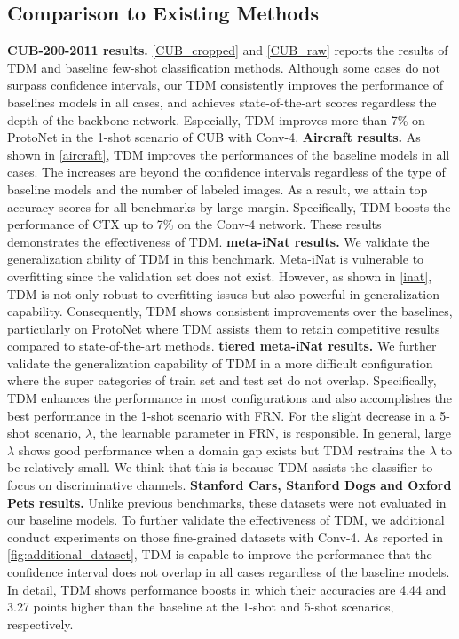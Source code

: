 \subsection{Comparison to Existing Methods}
\noindent\textbf{CUB-200-2011 results.} \cref{CUB_cropped} and \cref{CUB_raw} reports the results of TDM and baseline few-shot classification methods. 
Although some cases do not surpass confidence intervals, our TDM consistently improves the performance of baselines models in all cases, and achieves state-of-the-art scores regardless the depth of the backbone network.
Especially, TDM improves more than 7\% on ProtoNet in the 1-shot scenario of CUB with Conv-4. 
\newline
\textbf {Aircraft results.} 
As shown in \cref{aircraft}, TDM improves the performances of the baseline models in all cases. 
The increases are beyond the confidence intervals regardless of the type of baseline models and the number of labeled images. 
As a result, we attain top accuracy scores for all benchmarks by large margin. Specifically, TDM boosts the performance of CTX\cite{doersch2020crosstransformers} up to 7\% on the Conv-4 network.
These results demonstrates the effectiveness of TDM.
\newline
\textbf{meta-iNat results.} 
We validate the generalization ability of TDM in this benchmark. 
Meta-iNat is vulnerable to overfitting since the validation set does not exist.
However, as shown in \cref{inat}, TDM is not only robust to overfitting issues but also powerful in generalization capability.
Consequently, TDM shows consistent improvements over the baselines, particularly on ProtoNet where TDM assists them to retain competitive results compared to state-of-the-art methods.
\newline
\textbf{tiered meta-iNat results.} 
We further validate the generalization capability of TDM in a more difficult configuration where the super categories of train set and test set do not overlap. 
Specifically, TDM enhances the performance in most configurations and also accomplishes the best performance in the 1-shot scenario with FRN. 
For the slight decrease in a 5-shot scenario, $\lambda$, the learnable parameter in FRN, is responsible. 
In general, large $\lambda$ shows good performance when a domain gap exists but TDM restrains the $\lambda$ to be relatively small.
We think that this is because TDM assists the classifier to focus on discriminative channels\cite{wertheimer2021few}.
\newline
\textbf{Stanford Cars, Stanford Dogs and Oxford Pets results.} 
Unlike previous benchmarks, these datasets were not evaluated in our baseline models\cite{snell2017prototypical, simon2020adaptive, doersch2020crosstransformers ,wertheimer2021few}. 
To further validate the effectiveness of TDM, we additional conduct experiments on those fine-grained datasets with Conv-4.
As reported in \cref{fig:additional_dataset}, TDM is capable to improve the performance that the confidence interval does not overlap in all cases regardless of the baseline models.
In detail, TDM shows performance boosts in which their accuracies are 4.44 and 3.27 points higher than the baseline at the 1-shot and 5-shot scenarios, respectively.

